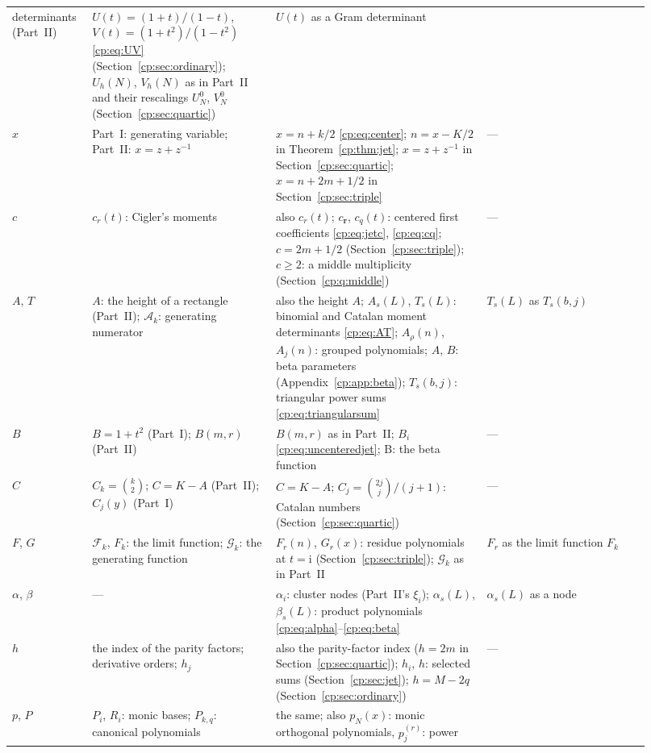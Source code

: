 \documentclass[11pt]{article}
\theoremstyle{definition}
\theoremstyle{remark}
\newcommand{\F}{\mathcal F}
\newcommand{\AN}{\mathscr A}
\newcommand{\GG}{\mathscr G}
\newcommand{\ii}{\mathrm i}
\theoremstyle{definition}
\theoremstyle{plain}
\numberwithin{equation}{section}
\begin{document}
{\begin{longtable}{@{}>{\raggedright\arraybackslash}p{0.10\linewidth}>{\raggedright\arraybackslash}p{0.27\linewidth}>{\raggedright\arraybackslash}p{0.31\linewidth}>{\raggedright\arraybackslash}p{0.24\linewidth}@{}}
determinants (Part~II) &
$U(t)=(1+t)/(1-t)$, $V(t)=(1+t^2)/(1-t^2)$ \eqref{cp:eq:UV}
(Section~\ref{cp:sec:ordinary}); $U_h(N)$, $V_h(N)$ as in Part~II and
their rescalings $U_N^0$, $V_N^0$ (Section~\ref{cp:sec:quartic}) &
$U(t)$ as a Gram determinant\\[3pt]
$x$ &
Part~I: generating variable; Part~II: $x=z+z^{-1}$ &
$x=n+k/2$ \eqref{cp:eq:center}; $n=x-K/2$ in Theorem~\ref{cp:thm:jet};
$x=z+z^{-1}$ in Section~\ref{cp:sec:quartic};
$x=n+2m+1/2$ in Section~\ref{cp:sec:triple} &
---\\[3pt]
$c$ &
$c_r(t)$: Cigler's moments &
also $c_r(t)$; $c_{\boldsymbol r}$, $c_q(t)$: centered first coefficients
\eqref{cp:eq:jetc}, \eqref{cp:eq:cq}; $c=2m+1/2$
(Section~\ref{cp:sec:triple}); $c\ge2$: a middle multiplicity
(Section~\ref{cp:q:middle}) &
---\\[3pt]
$A$, $T$ &
$A$: the height of a rectangle (Part~II); $\AN_k$: generating numerator &
also the height $A$; $A_s(L)$, $T_s(L)$: binomial and Catalan moment
determinants \eqref{cp:eq:AT}; $A_\rho(n)$, $A_j(n)$: grouped polynomials;
$A$, $B$: beta parameters (Appendix~\ref{cp:app:beta}); $T_s(b,j)$:
triangular power sums \eqref{cp:eq:triangularsum} &
$T_s(L)$ as $T_s(b,j)$\\[3pt]
$B$ &
$B=1+t^2$ (Part~I); $B(m,r)$ (Part~II) &
$B(m,r)$ as in Part~II; $B_i$ \eqref{cp:eq:uncenteredjet}; $\mathrm B$:
the beta function &
---\\[3pt]
$C$ &
$C_k=\binom k2$; $C=K-A$ (Part~II); $C_j(y)$ (Part~I) &
$C=K-A$; $C_j=\binom{2j}j/(j+1)$: Catalan numbers
(Section~\ref{cp:sec:quartic}) &
---\\[3pt]
$F$, $G$ &
$\F_k$, $F_k$: the limit function; $\GG_k$: the generating function &
$F_r(n)$, $G_r(x)$: residue polynomials at $t=\ii$
(Section~\ref{cp:sec:triple}); $\GG_k$ as in Part~II &
$F_r$ as the limit function $F_k$\\[3pt]
$\alpha$, $\beta$ &
--- &
$\alpha_i$: cluster nodes (Part~II's $\xi_i$); $\alpha_s(L)$,
$\beta_s(L)$: product polynomials \eqref{cp:eq:alpha}--\eqref{cp:eq:beta} &
$\alpha_s(L)$ as a node\\[3pt]
$h$ &
the index of the parity factors; derivative orders; $h_j$ &
also the parity-factor index ($h=2m$ in Section~\ref{cp:sec:quartic});
$h_i$, $h$: selected sums (Section~\ref{cp:sec:jet}); $h=M-2q$
(Section~\ref{cp:sec:ordinary}) &
---\\[3pt]
$p$, $P$ &
$P_i$, $R_i$: monic bases; $P_{k,q}$: canonical polynomials &
the same; also $p_N(x)$: monic orthogonal polynomials, $p_j^{(r)}$: power

\end{longtable}}
\end{document}
